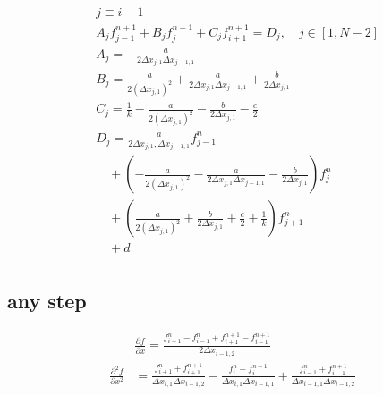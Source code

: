 \documentclass{article}
\begin{document}
    \begin{equation}
        \begin{split}
            & j \equiv i-1
            \\
            &A_{j} f_{j-1}^{n+1} + B_{j} f_{j}^{n+1} + C_{j} f_{i+1}^{n+1} = D_{j}, \quad j \in [1, N-2]
            \\
            &A_{j} =
            -\frac{a}{2\Delta x_{j,1} \Delta x_{j-1,1}}
            \\
            &B_{j} =
            \frac{a}{2(\Delta x_{j,1})^2}
            +\frac{a}{2\Delta x_{j,1} \Delta x_{j-1,1}}
            +\frac{b}{2 \Delta x_{j,1}}
            \\
            &C_{j} =
            \frac{1}{k}
            -\frac{a}{2 (\Delta x_{j,1})^2}
            -\frac{b}{2\Delta x_{j,1}}
            -\frac{c}{2}
            \\
            &D_{j} =
            \frac{a}{2\Delta x_{j,1}, \Delta x_{j-1,1}}f_{j-1}^n
            \\
            &\quad +\left(-\frac{a}{2(\Delta x_{j,1})^2}
            - \frac{a}{2\Delta x_{j,1} \Delta x_{j-1,1}} -\frac{b}{2\Delta x_{j,1}}\right) f_{j}^n
            \\
            &\quad +\left(\frac{a}{2(\Delta x_{j,1})^2} + \frac{b}{2\Delta x_{j,1}} + \frac{c}{2}
            +\frac{1}{k}\right) f_{j+1}^n
            \\
            &\quad + d \\
        \end{split}
    \end{equation}

\subsection{any step}

    \begin{equation}
        \begin{split}
            & \frac{\partial f}{\partial x} =
            \frac{f_{i+1}^n -f_{i-1}^n + f_{i+1}^{n+1} - f_{i-1}^{n+1}}
                {2 \Delta x_{i-1,2}} 
            \\
            \frac{\partial^2 f}{\partial x^2} &=
            \frac{f_{i+1}^n + f_{i+1}^{n+1}}
                {\Delta x_{i,1} \Delta x_{i-1,2}}
            - \frac{f_i^n + f_i^{n+1}}
                {\Delta x_{i,1} \Delta x_{i-1,1}}
            + \frac{f_{i-1}^n + f_{i-1}^{n+1}}
                {\Delta x_{i-1,1} \Delta x_{i-1,2}}
        \end{split}
    \end{equation}
\end{document}
